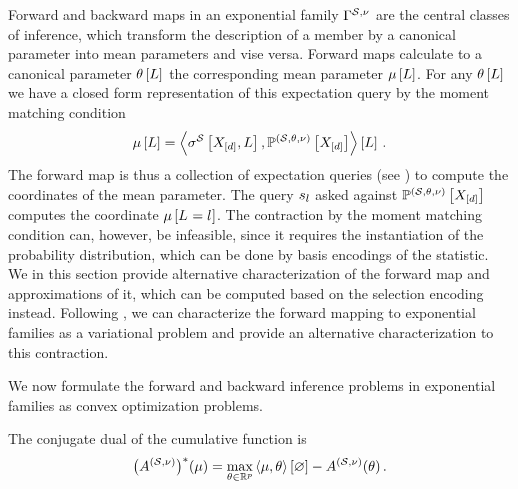 

Forward and backward maps in an exponential family $\Gamma^{\mathcal{S},\nu}$ are the central classes of inference, which transform the description of a member by a canonical parameter into mean parameters and vise versa.
Forward maps calculate to a canonical parameter $\theta\left[L\right]$ the corresponding mean parameter $\mu\left[L\right]$.
For any $\theta\left[L\right]$ we have a closed form representation of this expectation query by the moment matching condition
\begin{align*}
    \mu\left[L\right] = \left\langle \sigma^{\mathcal{S}}\left[X_{[d]},L\right],\mathbb{P}^{(\mathcal{S},\theta,\nu)}\left[X_{[d]}\right]\right\rangle \left[ L \right] \, .
\end{align*}
The forward map is thus a collection of expectation queries (see ) to compute the coordinates of the mean parameter.
The query $s_{l}$ asked against $\mathbb{P}^{(\mathcal{S},\theta,\nu)}\left[X_{[d]}\right]$ computes the coordinate $\mu\left[L_{}=l_{}\right]$.
The contraction by the moment matching condition can, however, be infeasible, since it requires the instantiation of the probability distribution, which can be done by basis encodings of the statistic.
We in this section provide alternative characterization of the forward map and approximations of it, which can be computed based on the selection encoding instead.
Following \cite{wainwright_graphical_2008}, we can characterize the forward mapping to exponential families as a variational problem and provide an alternative characterization to this contraction.



We now formulate the forward and backward inference problems in exponential families as convex optimization problems.

The conjugate dual of the cumulative function is
\begin{align*}
    \big(A^{(\mathcal{S},\nu)}\big)^*(\mu) = \max_{\theta\in\mathbb{R}^{p}} \left\langle \mu,\theta\right\rangle \left[ \varnothing \right] - A^{(\mathcal{S},\nu)}(\theta) \, .
\end{align*}

